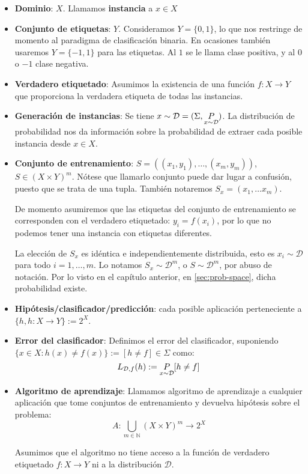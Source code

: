 \begin{itemize}
\item \textbf{Dominio}: $X$. Llamamos \textbf{instancia} a $x\in X$

\item \textbf{Conjunto de etiquetas}: $Y$. Consideramos $Y = \{0,1\}$, lo que nos restringe de momento al paradigma de clasificación binaria. 
En ocasiones también usaremos $Y = \{-1,1\}$ para las etiquetas. Al $1$ se le llama clase positiva, y al $0$ o $-1$ clase negativa.

\item \textbf{Verdadero etiquetado}: \sloppy Asumimos la existencia de una función ${f: X \rightarrow Y}$ 
que proporciona la verdadera etiqueta de todas las instancias.

\item \textbf{Generación de instancias}: \fussy Se tiene $x\sim \mathcal{D} = (\Sigma, \underset{x\sim \mathcal{D}}{P})$. La distribución de probabilidad nos da 
información sobre la probabilidad de extraer cada posible instancia desde  $x \in X$. 

\item \textbf{Conjunto de entrenamiento}: $S = ((x_1,y_1), \ldots, (x_m,y_m))$, $S\in (X \times Y)^m$.
Nótese que llamarlo conjunto puede dar lugar a confusión, puesto que se trata de una tupla. También notaremos 
$S_x = (x_1, \ldots x_m)$.

De momento asumiremos que las etiquetas del conjunto de entrenamiento se corresponden con el verdadero etiquetado: 
$y_i = f(x_i)$, por lo que no podemos tener una instancia con etiquetas diferentes.

La elección de $S_x$ es idéntica e independientemente distribuida, esto es $x_i \sim \mathcal{D}$ para todo $i=1, \ldots, m$.
Lo notamos $S_x \sim \mathcal{D}^m$, o $S \sim \mathcal{D}^m$, por abuso de notación. Por lo visto en el capítulo
anterior, en \ref{sec:prob-space}, dicha probabilidad existe.

\item \textbf{Hipótesis/clasificador/predicción}: cada posible aplicación perteneciente a 
$\{h, h:X \rightarrow Y\} := 2^{X}$. 

\item \textbf{Error del clasificador}: Definimos el error del clasificador, suponiendo 
$\{x\in X : h(x) \neq f(x)\} := [h\neq f] \in \Sigma$ como:
\[
  L_{\mathcal{D},f}(h) :=  \underset{x\sim \mathcal{D}}{P} [h \neq f]
\]

\item \textbf{Algoritmo de aprendizaje}: Llamamos algoritmo de aprendizaje a cualquier aplicación que tome conjuntos de 
entrenamiento y devuelva hipótesis sobre el problema:
\[
  A: \underset{m\in \mathbb{N}}{\bigcup} (X\times Y)^m \rightarrow 2^{X}
\]

Asumimos que el algoritmo no tiene acceso a la función de verdadero etiquetado $f: X \rightarrow Y$ ni a
la distribución $\mathcal{D}$.
\end{itemize}

